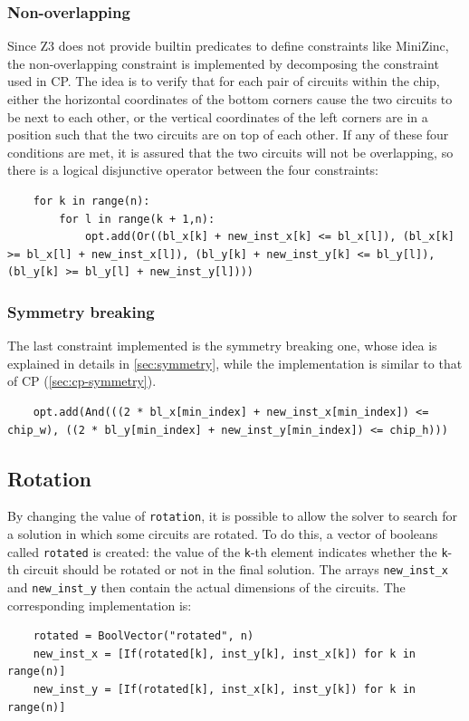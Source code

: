 \documentclass[a4paper, 12pt]{article}
\begin{document}
\subsubsection{Non-overlapping}

Since Z3 does not provide builtin predicates to define constraints like MiniZinc, the non-overlapping constraint is implemented by decomposing the constraint used in CP. The idea is to verify that for each pair of circuits within the chip, either the horizontal coordinates of the bottom corners cause the two circuits to be next to each other, or the vertical coordinates of the left corners are in a position such that the two circuits are on top of each other. If any of these four conditions are met, it is assured that the two circuits will not be overlapping, so there is a logical disjunctive operator between the four constraints:
\begin{verbatim}
    for k in range(n):
        for l in range(k + 1,n):
            opt.add(Or((bl_x[k] + new_inst_x[k] <= bl_x[l]), (bl_x[k] >= bl_x[l] + new_inst_x[l]), (bl_y[k] + new_inst_y[k] <= bl_y[l]), (bl_y[k] >= bl_y[l] + new_inst_y[l])))
\end{verbatim}


\subsubsection{Symmetry breaking}

The last constraint implemented is the symmetry breaking one, whose idea is explained in details in \cref{sec:symmetry}, while the implementation is similar to that of CP (\cref{sec:cp-symmetry}).
\begin{verbatim}
    opt.add(And(((2 * bl_x[min_index] + new_inst_x[min_index]) <= chip_w), ((2 * bl_y[min_index] + new_inst_y[min_index]) <= chip_h)))
\end{verbatim}


\subsection{Rotation}

By changing the value of \verb|rotation|, it is possible to allow the solver to search for a solution in which some circuits are rotated. To do this, a vector of booleans called \verb|rotated| is created: the value of the \verb|k|-th element indicates whether the \verb|k|-th circuit should be rotated or not in the final solution. The arrays \verb|new_inst_x| and \verb|new_inst_y| then contain the actual dimensions of the circuits. The corresponding implementation is:
\begin{verbatim}
    rotated = BoolVector("rotated", n)
    new_inst_x = [If(rotated[k], inst_y[k], inst_x[k]) for k in range(n)]
    new_inst_y = [If(rotated[k], inst_x[k], inst_y[k]) for k in range(n)]
\end{verbatim}
\end{document}

